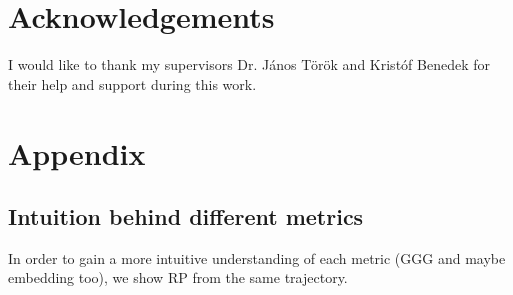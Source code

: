 \documentclass[a4paper,12pt]{article}
\begin{document}

\section{Acknowledgements }
\label{sec:acknowledgements}

I would like to thank my supervisors Dr. János Török and Kristóf Benedek for their help and support during this work.

\newpage



\section{Appendix}
\label{sec:appendix}

\subsection{Intuition behind different metrics}
\label{subsec:appendix_intuition_metrics}

In order to gain a more intuitive understanding of each metric (GGG and maybe embedding too), we show RP from the same trajectory.
\end{document}
